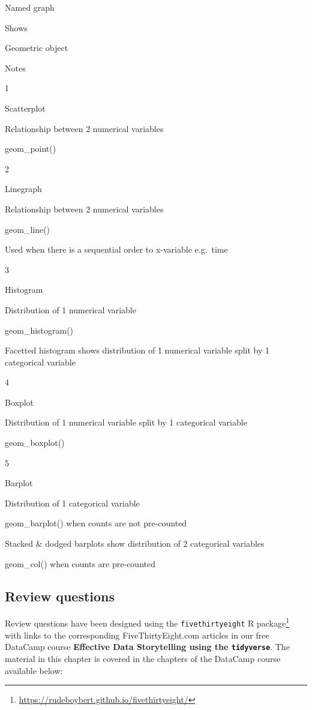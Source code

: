 \documentclass[12pt,]{krantz}
\renewcommand{\href}[2]{#2\footnote{\url{#1}}}
\begin{document}
Named graph

Shows

Geometric object

Notes

1

Scatterplot

Relationship between 2 numerical variables

geom\_point()

2

Linegraph

Relationship between 2 numerical variables

geom\_line()

Used when there is a sequential order to x-variable e.g.~time

3

Histogram

Distribution of 1 numerical variable

geom\_histogram()

Facetted histogram shows distribution of 1 numerical variable split by 1
categorical variable

4

Boxplot

Distribution of 1 numerical variable split by 1 categorical variable

geom\_boxplot()

5

Barplot

Distribution of 1 categorical variable

geom\_barplot() when counts are not pre-counted

Stacked \& dodged barplots show distribution of 2 categorical variables

geom\_col() when counts are pre-counted

\subsection{Review questions}\label{review-questions}

Review questions have been designed using the
\href{https://rudeboybert.github.io/fivethirtyeight/}{\texttt{fivethirtyeight}
R package} \citep{R-fivethirtyeight} with links to the corresponding
FiveThirtyEight.com articles in our free DataCamp course
\textbf{Effective Data Storytelling using the \texttt{tidyverse}}. The
material in this chapter is covered in the chapters of the DataCamp
course available below:
\end{document}
